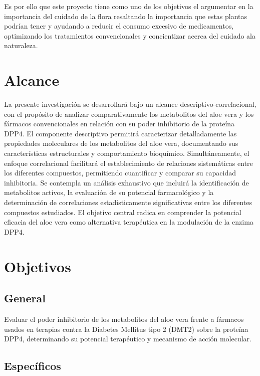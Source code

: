 Es por ello que este proyecto tiene como uno de los objetivos el argumentar en la importancia del cuidado de la flora resaltando la importancia que estas plantas podrían tener y ayudando a reducir el consumo excesivo de medicamentos, optimizando los tratamientos convencionales y concientizar acerca del cuidado ala naturaleza.

\section{Alcance}
La presente investigación se desarrollará bajo un alcance descriptivo-correlacional, con el propósito de analizar comparativamente los metabolitos del aloe vera y los fármacos convencionales en relación con su poder inhibitorio de la proteína DPP4.
El componente descriptivo permitirá caracterizar detalladamente las propiedades moleculares de los metabolitos del aloe vera, documentando sus características estructurales y comportamiento bioquímico. Simultáneamente, el enfoque correlacional facilitará el establecimiento de relaciones sistemáticas entre los diferentes compuestos, permitiendo cuantificar y comparar su capacidad inhibitoria.
Se contempla un análisis exhaustivo que incluirá la identificación de metabolitos activos, la evaluación de su potencial farmacológico y la determinación de correlaciones estadísticamente significativas entre los diferentes compuestos estudiados. El objetivo central radica en comprender la potencial eficacia del aloe vera como alternativa terapéutica en la modulación de la enzima DPP4.

\section{Objetivos}

\subsection{General}
Evaluar el poder inhibitorio de los metabolitos del aloe vera frente a fármacos usados en terapias contra la Diabetes Mellitus tipo 2 (DMT2) sobre la proteína DPP4, determinando su potencial terapéutico y mecanismo de acción molecular.

\subsection{Específicos}

